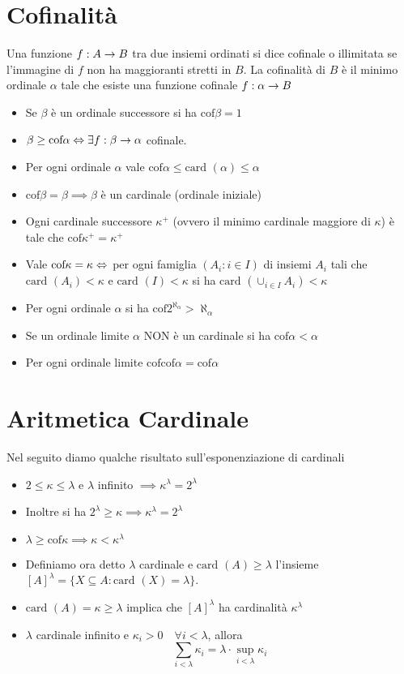 \documentclass[a4paper,NoNotes,GeneralMath]{stdmdoc}
\newcommand{\card}[1]{\text{card }({#1})}
\newcommand{\cof}{\text{cof}}
\begin{document}
	\section*{Cofinalità}
	Una funzione $f: A \rightarrow B$ tra due insiemi ordinati si dice cofinale o illimitata se l'immagine di $f$ non ha maggioranti stretti in $B$. La cofinalità di $B$ è il minimo ordinale $\alpha$ tale che esiste una funzione cofinale $f: \alpha \rightarrow B$
	\begin{itemize}
		\item Se $\beta$ è un ordinale successore si ha $\cof{\beta} = 1$
		\item $\beta \ge \cof{\alpha} \sse \exists f: \beta \rar \alpha$ cofinale.
		\item Per ogni ordinale $\alpha$ vale $\cof{\alpha} \le \card{\alpha} \le \alpha$
		\item $\cof{\beta} = \beta \implies \beta$ è un cardinale (ordinale iniziale)
		\item Ogni cardinale successore $\kappa^{+}$ (ovvero il minimo cardinale maggiore di $\kappa$) è tale che $\cof{\kappa^{+}} = \kappa^{+}$
		\item Vale $\cof{\kappa} = \kappa \sse $ per ogni famiglia $(A_i : i \in I)$ di insiemi $A_i$ tali che $\card{A_i} < \kappa$ e $\card{I} < \kappa$ si ha $\card{\cup_{i \in I} A_i} < \kappa$
		\item Per ogni ordinale $\alpha$ si ha $\cof{2^{\aleph_\alpha}} > \aleph_\alpha$
		\item Se un ordinale limite $\alpha$ NON è un cardinale si ha $\cof{\alpha} < \alpha$
		\item Per ogni ordinale limite $\cof{\cof{\alpha}} = \cof{\alpha}$
	\end{itemize}
	
	\section*{Aritmetica Cardinale}
	Nel seguito diamo qualche risultato sull'esponenziazione di cardinali
	\begin{itemize}
		\item $2 \le \kappa \le \lambda$ e $\lambda$ infinito $\implies \kappa^\lambda = 2^\lambda$
		\item Inoltre si ha $2^\lambda \ge \kappa \implies \kappa^\lambda = 2^\lambda$
		\item $\lambda \ge \cof{\kappa} \implies \kappa < \kappa^\lambda$
		\item Definiamo ora detto $\lambda$ cardinale e $\card{A} \ge \lambda$ l'insieme $[A]^\lambda = \{ X \subseteq A : \card{X} = \lambda \}$.
		\item $\card{A} = \kappa \ge \lambda$ implica che $[A]^\lambda$ ha cardinalità $\kappa^\lambda$
		\item $\lambda$ cardinale infinito e $\kappa_i > 0 \quad \forall i < \lambda$, allora $$ \sum_{i < \lambda} \kappa_i = \lambda \cdot \sup_{i < \lambda} \kappa_i $$ 
	\end{itemize}
	
\end{document}
